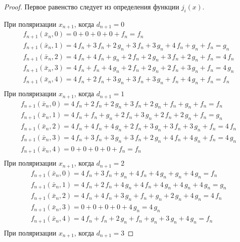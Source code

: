 \documentclass[bibliography=totoc, a4paper, 14pt]{extarticle}
\begin{document}
\begin{proof}

Первое равенство следует из определения функции $j_i(x)$.

При поляризации $x_{n+1}$, когда $d_{n+1} = 0$
$$\begin{array}{l}
f_{n+1}(\bar{x}_n, 0) = 0 + 0 + 0 + 0 + f_n = f_n \\
f_{n+1}(\bar{x}_n, 1) = 4\,f_n + 3\,f_n + 2\,g_n + 3\,f_n + 3\,g_n + 4\,f_n + g_n + f_n = g_n \\
f_{n+1}(\bar{x}_n, 2) = 4\,f_n + 4\,f_n + g_n + 2\,f_n + 2\,g_n + 3\,f_n + 2\,g_n + f_n = 4\,f_n \\
f_{n+1}(\bar{x}_n, 3) = 4\,f_n + f_n + 4\,g_n + 2\,f_n + 2\,g_n + 2\,f_n + 3\,g_n + f_n = 4\,g_n \\
f_{n+1}(\bar{x}_n, 4) = 4\,f_n + 2\,f_n + 3\,g_n + 3\,f_n + 3\,g_n + f_n + 4\,g_n + f_n = f_n \\
\end{array}$$
При поляризации $x_{n+1}$, когда $d_{n+1} = 1$
$$\begin{array}{l}
f_{n+1}(\bar{x}_n, 0) = 4\,f_n + 2\,f_n + 2\,g_n + 3\,f_n + 2\,g_n + f_n + g_n + f_n = f_n \\
f_{n+1}(\bar{x}_n, 1) = 4\,f_n + f_n + g_n + 2\,f_n + 3\,g_n + 2\,f_n + 2\,g_n + f_n = g_n \\
f_{n+1}(\bar{x}_n, 2) = 4\,f_n + 4\,f_n + 4\,g_n + 2\,f_n + 3\,g_n + 3\,f_n + 3\,g_n + f_n = 4\,f_n \\
f_{n+1}(\bar{x}_n, 3) = 4\,f_n + 3\,f_n + 3\,g_n + 3\,f_n + 2\,g_n + 4\,f_n + 4\,g_n + f_n = 4\,g_n \\
f_{n+1}(\bar{x}_n, 4) = 0 + 0 + 0 + 0 + f_n = f_n \\
\end{array}$$
При поляризации $x_{n+1}$, когда $d_{n+1} = 2$
$$\begin{array}{l}
f_{n+1}(\bar{x}_n, 0) = 4\,f_n + 3\,f_n + g_n + 4\,f_n + 4\,g_n + g_n + 4\,g_n = f_n \\
f_{n+1}(\bar{x}_n, 1) = 4\,f_n + 2\,f_n + 4\,g_n + 4\,f_n + 4\,g_n + 4\,g_n + 4\,g_n = g_n \\
f_{n+1}(\bar{x}_n, 2) = 4\,f_n + 4\,f_n + 3\,g_n + f_n + g_n + 2\,g_n + 4\,g_n = 4\,f_n \\
f_{n+1}(\bar{x}_n, 3) = 0 + 0 + 0 + 0 + 4\,g_n = 4\,g_n \\
f_{n+1}(\bar{x}_n, 4) = 4\,f_n + f_n + 2\,g_n + f_n + g_n + 3\,g_n + 4\,g_n = f_n \\
\end{array}$$
При поляризации $x_{n+1}$, когда $d_{n+1} = 3$

\end{proof}
\end{document}
